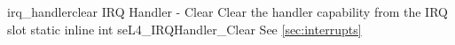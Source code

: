 %
%
%
%

\apidoc
{irq_handlerclear}
{IRQ Handler - Clear}
{Clear the handler capability from the IRQ slot}
{static inline int seL4\_IRQHandler\_Clear}
{
}
{\errorenumdesc}
{See \autoref{sec:interrupts}}
